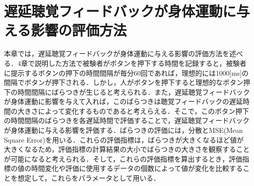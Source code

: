 \chapter{遅延聴覚フィードバックが身体運動に与える影響の評価方法}
本章では，遅延聴覚フィードバックが身体運動に与える影響の評価方法を述べる．4章で説明した方法で被験者がボタンを押下する時間を記録すると，被験者に提示するボタンの押下の時間間隔が毎分60回であれば，理想的には1000[ms]の間隔でボタンが押下される．しかし，人がボタンを押下すると理想的なボタン押下の時間間隔にばらつきが生じると考えられる．また，遅延聴覚フィードバックが身体運動に影響を与えて入れば，このばらつきは聴覚フィードバックの遅延時間の大きさによって変化するものであると考えらえる．そこで，このボタン押下の時間間隔のばらつきを各遅延時間で評価することで，遅延聴覚フィードバックが身体運動に与える影響を評価する．ばらつきの評価には，分散とMSE(Mean Square Error)を用いる．これらの評価指標は，ばらつきが大きくなるほど値が大きくなるため，評価指標の計算結果の大小でばらつきの大きさを観察することが可能になると考えられる．そして，これらの評価指標を算出するとき，評価指標の値の時間変化や評価に使用するデータの個数によって値が変化を比較することを想定して，これらをパラメータとして用いる．
